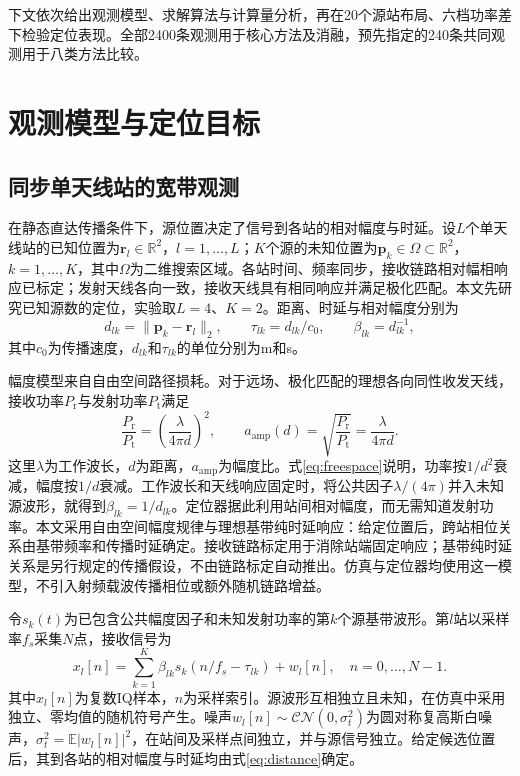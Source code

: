 \documentclass[a4paper,fleqn]{cas-sc}
\numberwithin{equation}{section}
\numberwithin{figure}{section}
\numberwithin{table}{section}
\newcommand{\R}{\mathbb R}
\newcommand{\E}{\mathbb E}
\begin{document}
下文依次给出观测模型、求解算法与计算量分析，再在20个源站布局、六档功率差下检验定位表现。全部2400条观测用于核心方法及消融，预先指定的240条共同观测用于八类方法比较。



\section{观测模型与定位目标}\label{sec:model}
\subsection{同步单天线站的宽带观测}
在静态直达传播条件下，源位置决定了信号到各站的相对幅度与时延。设$L$个单天线站的已知位置为$\bm r_l\in\R^2$，$l=1,\ldots,L$；$K$个源的未知位置为$\bm p_k\in\Omega\subset\R^2$，$k=1,\ldots,K$，其中$\Omega$为二维搜索区域。各站时间、频率同步，接收链路相对幅相响应已标定；发射天线各向一致，接收天线具有相同响应并满足极化匹配。本文先研究已知源数的定位，实验取$L=4$、$K=2$。距离、时延与相对幅度分别为
\begin{equation}
 d_{lk}=\|\bm p_k-\bm r_l\|_2,\qquad
 \tau_{lk}=d_{lk}/c_0,\qquad \beta_{lk}=d_{lk}^{-1},
 \label{eq:distance}
\end{equation}
其中$c_0$为传播速度，$d_{lk}$和$\tau_{lk}$的单位分别为m和s。

幅度模型来自自由空间路径损耗。对于远场、极化匹配的理想各向同性收发天线，接收功率$P_{\mathrm r}$与发射功率$P_{\mathrm t}$满足\cite{ITURP5252024}
\begin{equation}
 \frac{P_{\mathrm r}}{P_{\mathrm t}}
 =\left(\frac{\lambda}{4\pi d}\right)^2,\qquad
 a_{\mathrm{amp}}(d)=\sqrt{\frac{P_{\mathrm r}}{P_{\mathrm t}}}
 =\frac{\lambda}{4\pi d} .\label{eq:freespace}
\end{equation}
这里$\lambda$为工作波长，$d$为距离，$a_{\mathrm{amp}}$为幅度比。式\eqref{eq:freespace}说明，功率按$1/d^2$衰减，幅度按$1/d$衰减。工作波长和天线响应固定时，将公共因子$\lambda/(4\pi)$并入未知源波形，就得到$\beta_{lk}=1/d_{lk}$。定位器据此利用站间相对幅度，而无需知道发射功率。本文采用自由空间幅度规律与理想基带纯时延响应：给定位置后，跨站相位关系由基带频率和传播时延确定。接收链路标定用于消除站端固定响应；基带纯时延关系是另行规定的传播假设，不由链路标定自动推出。仿真与定位器均使用这一模型，不引入射频载波传播相位或额外随机链路增益。

令$s_k(t)$为已包含公共幅度因子和未知发射功率的第$k$个源基带波形。第$l$站以采样率$f_s$采集$N$点，接收信号为
\begin{equation}
 x_l[n]=\sum_{k=1}^{K}\beta_{lk}s_k(n/f_s-\tau_{lk})+w_l[n],
 \quad n=0,\ldots,N-1 .\label{eq:time}
\end{equation}
其中$x_l[n]$为复数IQ样本，$n$为采样索引。源波形互相独立且未知，在仿真中采用独立、零均值的随机符号产生。噪声$w_l[n]\sim\mathcal{CN}(0,\sigma_t^2)$为圆对称复高斯白噪声，$\sigma_t^2=\E|w_l[n]|^2$，在站间及采样点间独立，并与源信号独立。给定候选位置后，其到各站的相对幅度与时延均由式\eqref{eq:distance}确定。
\end{document}
